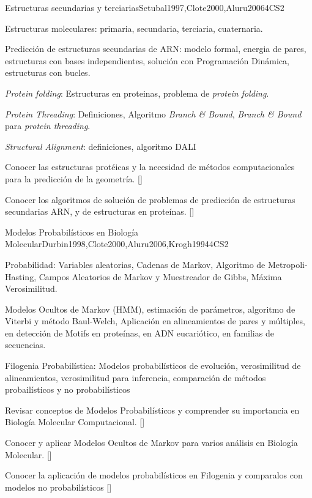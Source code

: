 \begin{syllabus}
\begin{unit}{Estructuras secundarias y terciarias}{}{Setubal1997,Clote2000,Aluru2006}{4}{CS2}
   \begin{topics}
        \item Estructuras moleculares: primaria, secundaria, terciaria, cuaternaria.
        \item Predicción de estructuras secundarias de ARN: modelo formal, energia de pares, estructuras con bases independientes, solución con Programación Dinámica, estructuras con bucles.
        \item \textit{Protein folding}: Estructuras en proteinas, problema de \textit{protein folding}.
        \item \textit{Protein Threading}: Definiciones, Algoritmo \textit{Branch \& Bound}, \textit{Branch \& Bound} para \textit{protein threading}.
        \item \textit{Structural Alignment}: definiciones, algoritmo DALI
   \end{topics}
   \begin{learningoutcomes}
        \item Conocer las estructuras protéicas y la necesidad de métodos computacionales para la predicción de la geometría. [\Familiarity]
        \item Conocer los algoritmos de solución de problemas de predicción de estructuras secundarias ARN, y de estructuras en proteínas. [\Assessment]
   \end{learningoutcomes}
\end{unit}

\begin{unit}{Modelos Probabilísticos en Biología Molecular}{}{Durbin1998,Clote2000,Aluru2006,Krogh1994}{4}{CS2}
   \begin{topics}
    \item Probabilidad: Variables aleatorias, Cadenas de Markov, Algoritmo de Metropoli-Hasting, Campos Aleatorios de Markov y Muestreador de Gibbs, Máxima Verosimilitud.
    \item Modelos Ocultos de Markov (HMM), estimación de parámetros, algoritmo de Viterbi y método Baul-Welch, Aplicación en alineamientos de pares y múltiples, en detección de Motifs en proteínas, en ADN eucariótico, en familias de secuencias.
		\item Filogenia Probabilística: Modelos probabilísticos de evolución, verosimilitud de alineamientos, verosimilitud para inferencia, comparación de métodos probailísticos y no probabilísticos
   \end{topics}
   \begin{learningoutcomes}
      \item  Revisar conceptos de Modelos Probabilísticos y comprender su importancia en Biología Molecular Computacional. [\Assessment]
	  \item Conocer y aplicar Modelos Ocultos de Markov para varios análisis en Biología Molecular. [\Usage]
		\item Conocer la aplicación de modelos probabilísticos en Filogenia y comparalos con modelos no probabilísticos [\Assessment]
   \end{learningoutcomes}
\end{unit}


\end{syllabus}
